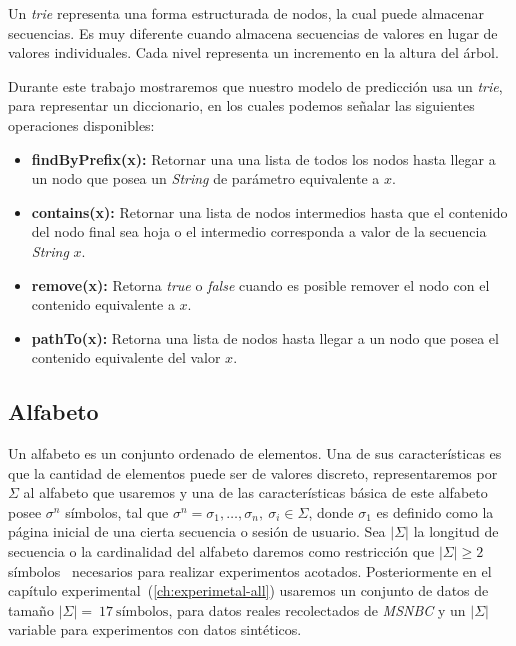 Un \emph{trie} representa una forma  estructurada de nodos, la cual puede almacenar secuencias. %
Es muy diferente cuando almacena secuencias de valores en lugar de valores individuales. Cada nivel representa un incremento en la altura del árbol.


Durante este trabajo mostraremos que nuestro modelo de predicción usa un \emph{trie}, para representar un diccionario, en los cuales podemos señalar las siguientes operaciones disponibles:

	\begin{itemize}	
		\item \textbf{findByPrefix(x):}  Retornar una una lista de todos los nodos hasta llegar a un nodo que posea un \emph{String} de parámetro equivalente a $x$.
		
		\item \textbf{contains(x):} Retornar una lista de nodos intermedios hasta que el contenido del nodo final sea hoja o el intermedio corresponda a valor de la secuencia \emph{String} $x$.
		
		\item \textbf{remove(x):} Retorna \emph{true} o \emph{false} cuando es posible remover el nodo con el contenido equivalente a $x$.
		
		\item \textbf{pathTo(x):} Retorna una lista de nodos hasta llegar a un nodo que posea el contenido equivalente del valor $x$.
	\end{itemize}







\subsection{Alfabeto} \label{concept-alphabet}


Un alfabeto es un conjunto ordenado de elementos. Una de sus características es que la cantidad de elementos puede ser de valores  discreto, representaremos por $\Sigma$ al alfabeto que usaremos y una de las características básica de este alfabeto posee $\sigma^{n}$ símbolos, tal que $\sigma^{n}= \sigma_{1}, \dots, \sigma_{n},\ \sigma_{i} \in \Sigma$, donde {$\sigma_{1}$}\label{concept-alphabet-homepage} es definido como la página inicial de una cierta secuencia  o sesión de usuario. Sea $|\Sigma|$ la longitud de secuencia o la cardinalidad del alfabeto daremos como restricción que $|\Sigma| \geq 2$ símbolos~\cite{Dmitry2002} necesarios para realizar experimentos acotados. Posteriormente en el capítulo experimental~(\ref{ch:experimetal-all}) usaremos un conjunto de datos de tamaño $|\Sigma| =\ 17\  \mbox{símbolos}$, para datos reales recolectados de \emph{MSNBC}\cite{Claude2014} y un $|\Sigma|$ variable para experimentos con datos sintéticos.

